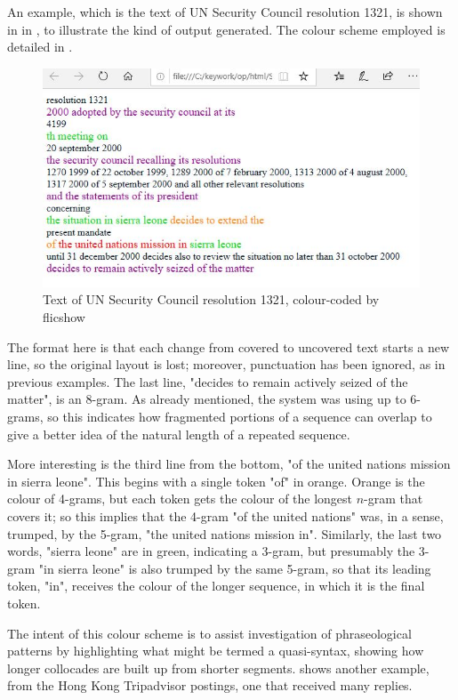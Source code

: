 \documentclass[output=paper]{langscibook}
\begin{document}
An example, which is the text of UN Security Council resolution 1321, is shown in in , to illustrate the kind of output generated. The colour scheme employed is detailed in .

  
\begin{figure}
\includegraphics[width=\textwidth]{figures/forsyth-img001.jpg}
\caption{Text of UN Security Council resolution 1321, colour-coded by flicshow}
\label{fig:forsyth:1}
\end{figure}

The format here is that each change from covered to uncovered text starts a new line, so the original layout is lost; moreover, punctuation has been ignored, as in previous examples. The last line, "decides to remain actively seized of the matter", is an 8-gram. As already mentioned, the system was using up to 6-grams, so this indicates how fragmented portions of a sequence can overlap to give a better idea of the natural length of a repeated sequence.

More interesting is the third line from the bottom, "of the united nations mission in sierra leone". This begins with a single token "of" in orange. Orange is the colour of 4-grams, but each token gets the colour of the longest $n$-gram that covers it; so this implies that the 4-gram "of the united nations" was, in a sense, trumped, by the 5-gram, "the united nations mission in". Similarly, the last two words, "sierra leone" are in green, indicating a 3-gram, but presumably the 3-gram "in sierra leone" is also trumped by the same 5-gram, so that its leading token, "in", receives the colour of the longer sequence, in which it is the final token.

The intent of this colour scheme is to assist investigation of phraseological patterns by highlighting what might be termed a quasi-syntax, showing how longer collocades are built up from shorter segments.  shows another example, from the Hong Kong Tripadvisor postings, one that received many replies.
\end{document}
